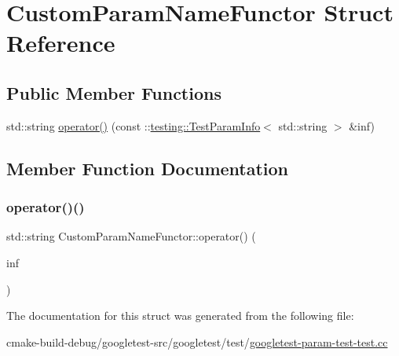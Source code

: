 \hypertarget{structCustomParamNameFunctor}{}\section{Custom\+Param\+Name\+Functor Struct Reference}
\label{structCustomParamNameFunctor}
\subsection*{Public Member Functions}
\begin{DoxyCompactItemize}
\item 
std\+::string \mbox{\hyperlink{structCustomParamNameFunctor_a364d073efd6cb9a05e9d1c97565288ef}{operator()}} (const \+::\mbox{\hyperlink{structtesting_1_1TestParamInfo}{testing\+::\+Test\+Param\+Info}}$<$ std\+::string $>$ \&inf)
\end{DoxyCompactItemize}


\subsection{Member Function Documentation}
\mbox{\label{structCustomParamNameFunctor_a364d073efd6cb9a05e9d1c97565288ef}} 
\subsubsection{\texorpdfstring{operator()()}{operator()()}}
{\footnotesize\ttfamily std\+::string Custom\+Param\+Name\+Functor\+::operator() (\begin{DoxyParamCaption}\item[{const \+::\mbox{\hyperlink{structtesting_1_1TestParamInfo}{testing\+::\+Test\+Param\+Info}}$<$ std\+::string $>$ \&}]{inf }\end{DoxyParamCaption})\hspace{0.3cm}{\ttfamily [inline]}}



The documentation for this struct was generated from the following file\+:\begin{DoxyCompactItemize}
\item 
cmake-\/build-\/debug/googletest-\/src/googletest/test/\mbox{\hyperlink{googletest-param-test-test_8cc}{googletest-\/param-\/test-\/test.\+cc}}\end{DoxyCompactItemize}
